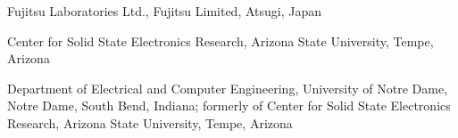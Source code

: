 \tableofcontents






\begin{contributors}
 Fujitsu Laboratories Ltd., Fujitsu Limited, Atsugi, Japan

 Center for Solid State Electronics Research, Arizona State University, Tempe, Arizona

 Department of Electrical and Computer Engineering, University of Notre Dame, Notre Dame, South Bend, Indiana; formerly of Center for Solid State Electronics Research, Arizona State University, Tempe, Arizona 
\end{contributors}


\begin{foreword}
\lipsum[1-2]
\end{foreword}


\begin{preface}
\lipsum[1-1]
\prefaceauthor{}
\end{preface}



\acknowledgments
\lipsum[1-2]

